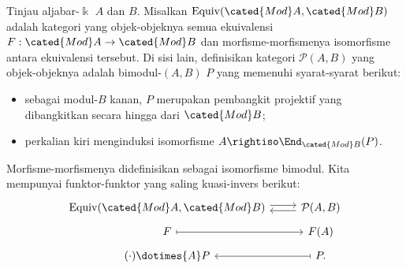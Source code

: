 \begin{theorem}\label{prop:Morita-refined}
	Tinjau aljabar-$\Bbbk$ $A$ dan $B$. Misalkan
	$\mathrm{Equiv}(\cated{Mod}A,\cated{Mod}B)$ adalah kategori yang
	objek-objeknya semua ekuivalensi
	$F:\cated{Mod}A\to\cated{Mod}B$ dan morfisme-morfismenya isomorfisme antara
	ekuivalensi tersebut. Di sisi lain, definisikan kategori
	$\mathcal{P}(A,B)$ yang objek-objeknya adalah bimodul-$(A,B)$ $P$ yang
	memenuhi syarat-syarat berikut:
	\begin{itemize}
		\item sebagai modul-$B$ kanan, $P$ merupakan pembangkit projektif yang
		dibangkitkan secara hingga dari $\cated{Mod}B$;
		\item perkalian kiri menginduksi isomorfisme
		$A\rightiso\End_{\cated{Mod}B}(P)$.
	\end{itemize}
	Morfisme-morfismenya didefinisikan sebagai isomorfisme bimodul. Kita
	mempunyai funktor-funktor yang saling kuasi-invers berikut:
	\[
	\begin{tikzcd}[row sep=tiny]
		\mathrm{Equiv}(\cated{Mod}A, \cated{Mod}B) \arrow[shift left, r] & \mathcal{P}(A, B) \arrow[shift left, l] \\
		F \arrow[mapsto, r] & F(A) \\
		(\cdot) \dotimes{A} P & P \arrow[mapsto, l] .
	\end{tikzcd}
	\]
\end{theorem}
